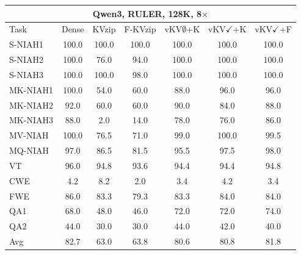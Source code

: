 \begin{tabular}{lcccccc}
\toprule
\multicolumn{7}{c}{Qwen3, RULER, 128K, 8$\times$} \\
\midrule
Task & Dense & KVzip & F-KVzip & vKV$\emptyset$+K & vKV$\checkmark$+K & vKV$\checkmark$+F \\
\midrule
S-NIAH1 & 100.0 & 100.0 & 100.0 & 100.0 & 100.0 & 100.0 \\
S-NIAH2 & 100.0 & 76.0 & 94.0 & 100.0 & 100.0 & 100.0 \\
S-NIAH3 & 100.0 & 100.0 & 98.0 & 100.0 & 100.0 & 100.0 \\
MK-NIAH1 & 100.0 & 54.0 & 60.0 & 88.0 & 96.0 & 96.0 \\
MK-NIAH2 & 92.0 & 60.0 & 60.0 & 90.0 & 84.0 & 88.0 \\
MK-NIAH3 & 88.0 & 2.0 & 14.0 & 78.0 & 76.0 & 86.0 \\
MV-NIAH & 100.0 & 76.5 & 71.0 & 99.0 & 100.0 & 99.5 \\
MQ-NIAH & 97.0 & 86.5 & 81.5 & 95.5 & 97.5 & 98.0 \\
VT & 96.0 & 94.8 & 93.6 & 94.4 & 94.4 & 94.8 \\
CWE & 4.2 & 8.2 & 2.0 & 3.4 & 4.2 & 3.4 \\
FWE & 86.0 & 83.3 & 79.3 & 83.3 & 84.0 & 84.0 \\
QA1 & 68.0 & 48.0 & 46.0 & 72.0 & 72.0 & 74.0 \\
QA2 & 44.0 & 30.0 & 30.0 & 44.0 & 42.0 & 40.0 \\
\midrule
Avg & 82.7 & 63.0 & 63.8 & 80.6 & 80.8 & 81.8 \\
\bottomrule
\end{tabular}
\vspace{0.8em}

